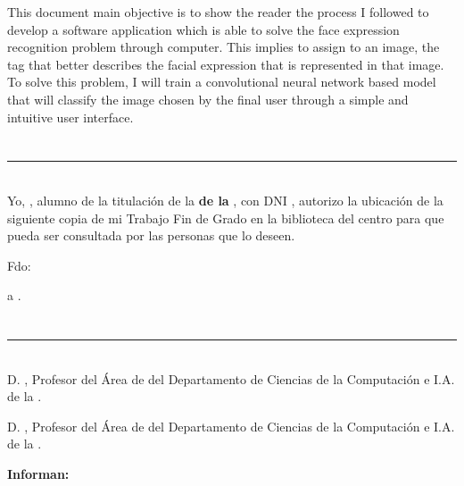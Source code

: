 This document main objective is to show the reader the process I followed to develop a software application which is able to solve the face expression recognition problem through computer. This implies to assign to an image, the tag that better describes the facial expression that is represented in that image. To solve this problem, I will train a convolutional neural network based model that will classify the image chosen by the final user through a simple and intuitive user interface.

\chapter*{}
\thispagestyle{empty}

\noindent\rule[-1ex]{\textwidth}{2pt}\\[4.5ex]

Yo, \textbf{\myName}, alumno de la titulación \myDegree de la \textbf{\myFaculty de la \myUni}, con DNI \myDNI, autorizo la
ubicación de la siguiente copia de mi Trabajo Fin de Grado en la biblioteca del centro para que pueda ser
consultada por las personas que lo deseen.

\vspace{6cm}

\noindent Fdo: \myName

\vspace{2cm}

\begin{flushright}
\myLocation a \myTime .
\end{flushright}


\chapter*{}
\thispagestyle{empty}

\noindent\rule[-1ex]{\textwidth}{2pt}\\[4.5ex]

D. \textbf{\myProf}, Profesor del Área de \myDepartment del Departamento de Ciencias de la Computación e I.A. de la \myUni.

\vspace{0.5cm}

D. \textbf{\myOtherProf}, Profesor del Área de \myDepartment del Departamento de Ciencias de la Computación e I.A. de la \myUni.


\vspace{0.5cm}

\textbf{Informan:}

\vspace{0.5cm}

